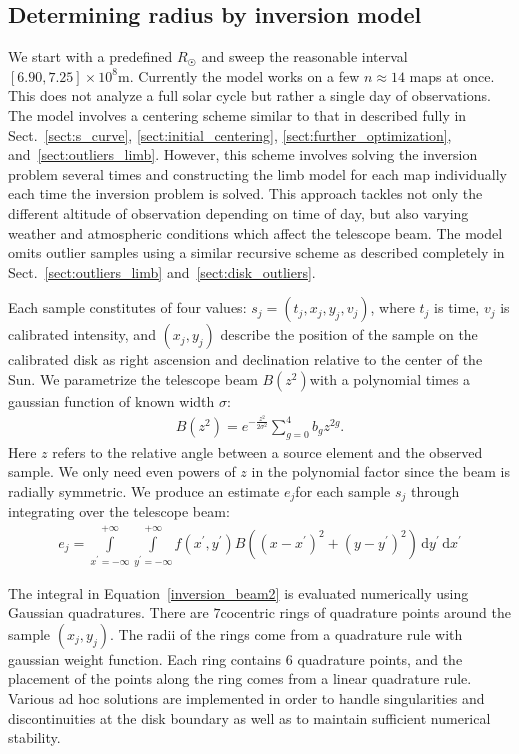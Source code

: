 \documentclass{aa}
\newcommand{\eqnl}[2]{\begin{eqnarray}\label{#1}#2\end{eqnarray}}
\newcommand{\intef}[4]{\int \limits_{#1 = #2}^{#3} \! #4 \, \mathrm{d} #1}
\begin{document}
  \subsection{Determining radius by inversion model} \label{sect:radius_method2}

  We start with a predefined $R_{\astrosun}$ and sweep the reasonable interval $[6.90, 7.25] \times 10^8 \mathrm{m}$. 
  Currently the model works on a few $n \approx 14$ maps at once. This does not analyze a full solar cycle but rather a 
  single day of observations. The model involves a centering scheme similar to that in described fully in 
  Sect.~\ref{sect:s_curve}, \ref{sect:initial_centering}, \ref{sect:further_optimization}, and~\ref{sect:outliers_limb}. However, this 
  scheme involves solving the inversion problem several times and constructing the limb model for each map individually 
  each time the inversion problem is solved. This approach tackles not only the different altitude of observation 
  depending on time of day, but also varying weather and atmospheric conditions which affect the telescope beam. The 
  model omits outlier samples using a similar recursive scheme as described completely in 
  Sect.~\ref{sect:outliers_limb} and~\ref{sect:disk_outliers}.

  Each sample constitutes of four values: $s_j = (t_j, x_j, y_j, v_j)$, where $t_j$ is time, $v_j$ is calibrated intensity, 
  and $(x_j,y_j)$ describe the position of the sample on the calibrated disk as right ascension and declination 
  relative to the center of the Sun. We parametrize the telescope beam $B(z^2)$with a polynomial times a gaussian function of known width $\sigma$:
  \eqnl{inversion_beam}{
  B(z^2) = e^{-\frac{z^2}{2 \sigma^2}} \sum \limits_{g=0}^{4} b_g z^{2g} \text{.}
  }
  Here $z$ refers to the relative angle between a source element and the observed sample. We only need even powers of $z$ in the polynomial factor since the beam is radially symmetric. We produce an estimate $e_j$for each sample $s_j$ through integrating over the telescope beam:
  \eqnl{inversion_beam2}{
  e_j = \intef{x^{\prime}}{-\infty}{+\infty}{ \intef{y^{\prime}}{-\infty}{+\infty}{ f(x^{\prime}, y^{\prime}) B \left( \left( x - x^{\prime} \right)^2 + \left( y - y^{\prime} \right)^2 \right)}}
  }

  The integral in Equation~\ref{inversion_beam2} is evaluated numerically using Gaussian quadratures. There are 
  $7$cocentric rings of quadrature points around the sample $(x_j,y_j)$. The radii of the rings come from a quadrature 
  rule with gaussian weight function. Each ring contains $6$ quadrature points, and the placement of the points along the ring comes from a linear 
  quadrature rule. Various ad hoc solutions are implemented in order to handle singularities and discontinuities at the 
  disk boundary as well as to maintain sufficient numerical stability.
\end{document}
